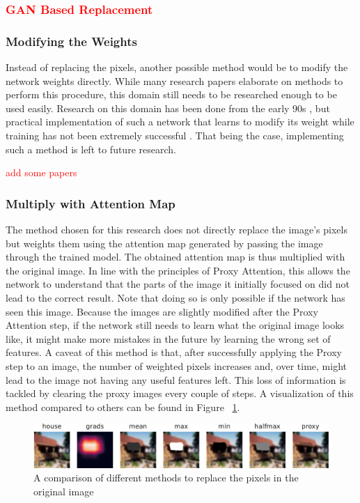 \subsubsection{\textcolor{red}{GAN Based Replacement}}


\subsubsection{Modifying the Weights}
Instead of replacing the pixels, another possible method would be to modify the network weights directly. While many research papers elaborate on methods to perform this procedure, this domain still needs to be researched enough to be used easily. Research on this domain has been done from the early 90s \cite{schmidhuberSelfReferentialWeightMatrix1993}, but practical implementation of such a network that learns to modify its weight while training has not been extremely successful \cite{irieModernSelfReferentialWeight2022}.
That being the case, implementing such a method is left to future research.

\textcolor{red}{add some papers}

\subsubsection{Multiply with Attention Map}
The method chosen for this research does not directly replace the image's pixels but weights them using the attention map generated by passing the image through the trained model.
The obtained attention map is thus multiplied with the original image. In line with the principles of Proxy Attention, this allows the network to understand that the parts of the image it initially focused on did not lead to the correct result. Note that doing so is only possible if the network has seen this image. Because the images are slightly modified after the Proxy Attention step, if the network still needs to learn what the original image looks like, it might make more mistakes in the future by learning the wrong set of features.
A caveat of this method is that, after successfully applying the Proxy step to an image, the number of weighted pixels increases and, over time, might lead to the image not having any useful features left. This loss of information is tackled by clearing the proxy images every couple of steps.
A visualization of this method compared to others can be found in Figure ~\ref{fig:methods}.

\begin{figure}[h]
    \centering
    \includegraphics[width=1\textwidth]{images/methods.pdf}
    \caption{A comparison of different methods to replace the pixels in the original image}
    \label{fig:methods}
\end{figure}

